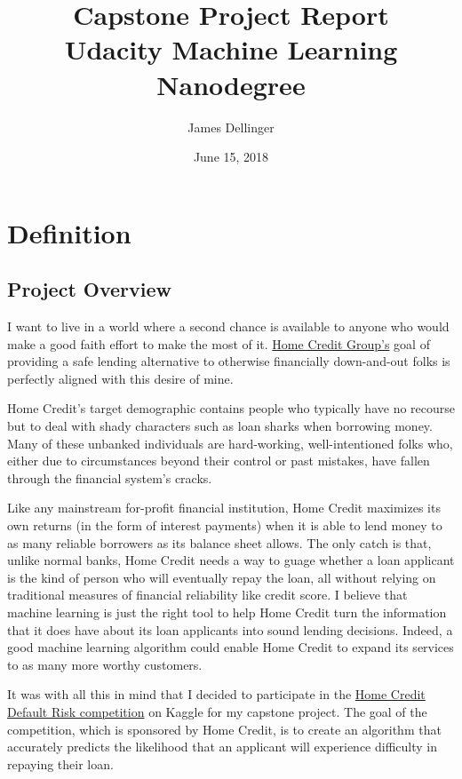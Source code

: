 \documentclass[12pt, letterpaper]{article}
\title{Capstone Project Report\\[8pt]
\normalsize{Udacity Machine Learning Nanodegree}}
\date{June 15, 2018}
\author{James Dellinger}
\begin{document}
\maketitle

\section{Definition}
\subsection{Project Overview}
I want to live in a world where a second chance is available to anyone who would make a good faith effort to make the most of it. \href{http://www.homecredit.net}{Home Credit Group’s}\cite{homecreditwebsite} goal of providing a safe lending alternative to otherwise financially down-and-out folks is perfectly aligned with this desire of mine.

Home Credit's target demographic contains people who typically have no recourse but to deal with shady characters such as loan sharks when borrowing money. Many of these unbanked individuals are hard-working, well-intentioned folks who, either due to circumstances beyond their control or past mistakes, have fallen through the financial system’s cracks.

Like any mainstream for-profit financial institution, Home Credit maximizes its own returns (in the form of interest payments) when it is able to lend money to as many reliable borrowers as its balance sheet allows. The only catch is that, unlike normal banks, Home Credit needs a way to guage whether a loan applicant is the kind of person who will eventually repay the loan, all without relying on traditional measures of financial reliability like credit score. I believe that machine learning is just the right tool to help Home Credit turn the information that it does have about its loan applicants into sound lending decisions. Indeed, a good machine learning algorithm could enable Home Credit to expand its services to as many more worthy customers.

It was with all this in mind that I decided to participate in the \href{https://www.kaggle.com/c/home-credit-default-risk}{Home Credit Default Risk competition} on Kaggle\cite{kagglehomecreditcompetitionoverview} for my capstone project. The goal of the competition, which is sponsored by Home Credit, is to create an algorithm that accurately predicts the likelihood that an applicant will experience difficulty in repaying their loan.
\end{document}

